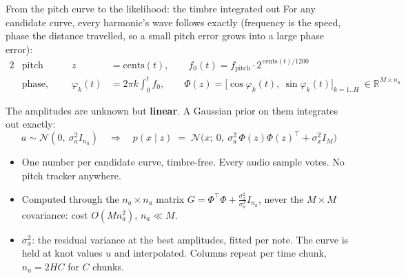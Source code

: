 \documentclass[aspectratio=169,11pt]{beamer}
\begin{document}
\begin{frame}{From the pitch curve to the likelihood: the timbre integrated out}
  \small
  For any candidate curve, every harmonic's wave follows exactly
  (frequency is the speed, phase the distance travelled, so a small
  pitch error grows into a large phase error):
  \vspace{-1mm}
  \begin{alignat*}{2}
    &\text{pitch curve}\qquad & z &= \text{cents}(t),\qquad
       f_0(t) = f_{\text{pitch}}\cdot 2^{\,\text{cents}(t)/1200}\\[0.5mm]
    &\text{phase, design} & \varphi_k(t) &= 2\pi k \int_0^{t} f_0,\qquad
       \Phi(z) = \bigl[\cos\varphi_k(t),\ \sin\varphi_k(t)\bigr]_{k=1..H}
       \ \in \mathbb R^{M\times n_a}
  \end{alignat*}
  \vspace{-3mm}

  The amplitudes are unknown but \textbf{linear}. A Gaussian prior on
  them integrates out exactly:
  \vspace{-1mm}
  \begin{equation*}
    a \sim \mathcal N(0,\ \sigma_a^2 I_{n_a})
    \quad\Longrightarrow\quad
    p(x \mid z) \;=\; \mathcal N\!\bigl(x;\ 0,\ \sigma_a^2\,\Phi(z)\Phi(z)^{\!\top} + \sigma_x^2 I_M\bigr)
  \end{equation*}
  \vspace{-3mm}
  \begin{itemize}
    \item One number per candidate curve, timbre-free. Every audio
          sample votes. No pitch tracker anywhere.
    \item Computed through the $n_a \times n_a$ matrix
          $G = \Phi^{\!\top}\Phi + \tfrac{\sigma_x^2}{\sigma_a^2} I_{n_a}$,
          never the $M \times M$ covariance: cost $O(M n_a^2)$, $n_a \ll M$.
    \item $\sigma_x^2$: the residual variance at the best amplitudes,
          fitted per note. The curve is held at knot values $u$ and
          interpolated. Columns repeat per time chunk, $n_a = 2HC$ for
          $C$ chunks.
  \end{itemize}
\end{frame}
\end{document}
